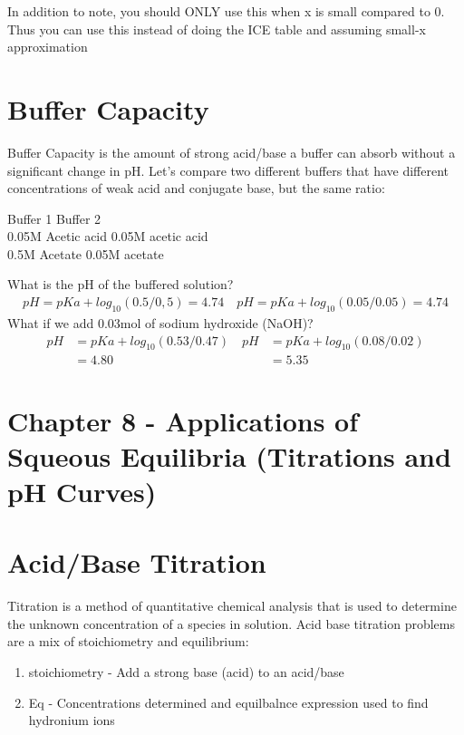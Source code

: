 \documentclass{article}  %
\begin{document}
In addition to note, you should ONLY use this when x is small compared to 0. Thus you can use this instead of doing the ICE table and assuming small-x approximation

\section*{Buffer Capacity}
Buffer Capacity is the amount of strong acid/base a buffer can absorb without a significant change in pH. 
\newline
Let's compare two different buffers that have different concentrations of weak acid and conjugate base, but the same ratio:
\begin{center}
    Buffer 1 \quad Buffer 2 \\
    0.05M Acetic acid \quad 0.05M acetic acid \\
    0.5M Acetate \quad 0.05M acetate
\end{center}
What is the pH of the buffered solution?
\begin{equation*}
    \begin{aligned}
        pH  = pKa + log_{10}(0.5/0,5) = 4.74 \quad pH  = pKa + log_{10}(0.05/0.05) = 4.74
    \end{aligned}
\end{equation*}
What if we add 0.03mol of sodium hydroxide (NaOH)?
\begin{equation*}
    \begin{aligned}
        pH  &= pKa + log_{10}(0.53/0.47) \quad pH  &= pKa + log_{10}(0.08/0.02) \\
        &= 4.80 \quad &= 5.35
    \end{aligned}
\end{equation*} %

\section*{Chapter 8 - Applications of Squeous Equilibria (Titrations and pH Curves)}

\section*{Acid/Base Titration}
Titration is a method of quantitative chemical analysis that is used to determine the unknown concentration of a species in solution. 
\newline
Acid base titration problems are a mix of stoichiometry and equilibrium:
\begin{enumerate}
    \item stoichiometry - Add a strong base (acid) to an acid/base
    \item Eq - Concentrations determined and equilbalnce expression used to find hydronium ions
\end{enumerate}
\end{document}
